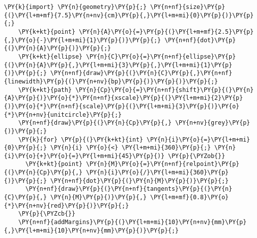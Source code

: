 \begin{Verbatim}[commandchars=\\\{\}]
    \PY{k}{import} \PY{n}{geometry}\PY{p}{;} \PY{n+nf}{size}\PY{p}{(}\PY{l+m+mf}{7.5}\PY{n+nv}{cm}\PY{p}{,}\PY{l+m+mi}{0}\PY{p}{)}\PY{p}{;}
    \PY{k+kt}{point} \PY{n}{A}\PY{o}{=}\PY{p}{(}\PY{l+m+mf}{2.5}\PY{p}{,}\PY{o}{-}\PY{l+m+mi}{1}\PY{p}{)}\PY{p}{;} \PY{n+nf}{dot}\PY{p}{(}\PY{n}{A}\PY{p}{)}\PY{p}{;}
    \PY{k+kt}{ellipse} \PY{n}{C}\PY{o}{=}\PY{n+nf}{ellipse}\PY{p}{(}\PY{n}{A}\PY{p}{,}\PY{l+m+mi}{3}\PY{p}{,}\PY{l+m+mi}{1}\PY{p}{)}\PY{p}{;} \PY{n+nf}{draw}\PY{p}{(}\PY{n}{C}\PY{p}{,}\PY{n+nf}{linewidth}\PY{p}{(}\PY{n+nv}{bp}\PY{p}{)}\PY{p}{)}\PY{p}{;}
    \PY{k+kt}{path} \PY{n}{Cp}\PY{o}{=}\PY{n+nf}{shift}\PY{p}{(}\PY{n}{A}\PY{p}{)}\PY{o}{*}\PY{n+nf}{xscale}\PY{p}{(}\PY{l+m+mi}{2}\PY{p}{)}\PY{o}{*}\PY{n+nf}{scale}\PY{p}{(}\PY{l+m+mi}{3}\PY{p}{)}\PY{o}{*}\PY{n+nv}{unitcircle}\PY{p}{;}
    \PY{n+nf}{draw}\PY{p}{(}\PY{n}{Cp}\PY{p}{,} \PY{n+nv}{grey}\PY{p}{)}\PY{p}{;}
    \PY{k}{for} \PY{p}{(}\PY{k+kt}{int} \PY{n}{i}\PY{o}{=}\PY{l+m+mi}{0}\PY{p}{;} \PY{n}{i} \PY{o}{<} \PY{l+m+mi}{360}\PY{p}{;} \PY{n}{i}\PY{o}{+}\PY{o}{=}\PY{l+m+mi}{45}\PY{p}{)} \PY{p}{\PYZob{}}
      \PY{k+kt}{point} \PY{n}{M}\PY{o}{=}\PY{n+nf}{relpoint}\PY{p}{(}\PY{n}{Cp}\PY{p}{,} \PY{n}{i}\PY{o}{/}\PY{l+m+mi}{360}\PY{p}{)}\PY{p}{;} \PY{n+nf}{dot}\PY{p}{(}\PY{n}{M}\PY{p}{)}\PY{p}{;}
      \PY{n+nf}{draw}\PY{p}{(}\PY{n+nf}{tangents}\PY{p}{(}\PY{n}{C}\PY{p}{,} \PY{n}{M}\PY{p}{)}\PY{p}{,} \PY{l+m+mf}{0.8}\PY{o}{*}\PY{n+nv}{red}\PY{p}{)}\PY{p}{;}
    \PY{p}{\PYZcb{}}
    \PY{n+nf}{addMargins}\PY{p}{(}\PY{l+m+mi}{10}\PY{n+nv}{mm}\PY{p}{,}\PY{l+m+mi}{10}\PY{n+nv}{mm}\PY{p}{)}\PY{p}{;}
\end{Verbatim}
